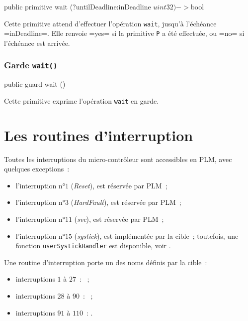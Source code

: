 \begin{PLM}
  public primitive wait (?untilDeadline:inDeadline $uint32) -> $bool
\end{PLM}

Cette primitive attend d'effectuer l'opération \texttt{wait}, jusqu'à l'échéance \plm=inDeadline=. Elle renvoie \plm=yes= si la primitive \texttt{P} a été effectuée, ou \plm=no= si l'échéance est arrivée.





\subsubsection{Garde \texttt{wait()}}

\begin{PLM}
  public guard wait ()
\end{PLM}

Cette primitive exprime l'opération \texttt{wait} en garde.












\section{Les routines d'interruption}

Toutes les interruptions du micro-contrôleur sont accessibles en PLM, avec quelques exceptions~:
\begin{itemize}
  \item l'interruption n°$1$ (\emph{Reset}), est réservée par PLM~;
  \item l'interruption n°$3$ (\emph{HardFault}), est réservée par PLM~;
  \item l'interruption n°$11$ (\emph{svc}), est réservée par PLM~;
  \item l'interruption n°$15$ (\emph{systick}), est implémentée par la cible~; toutefois, une fonction \texttt{userSystickHandler} est disponible, voir .
\end{itemize}

Une routine d'interruption porte un des noms définis par la cible~:
\begin{itemize}
  \item interruptions $1$ à $27$~: ~;
  \item interruptions $28$ à $90$~: ~;
  \item interruptions $91$ à $110$~: .
\end{itemize}




